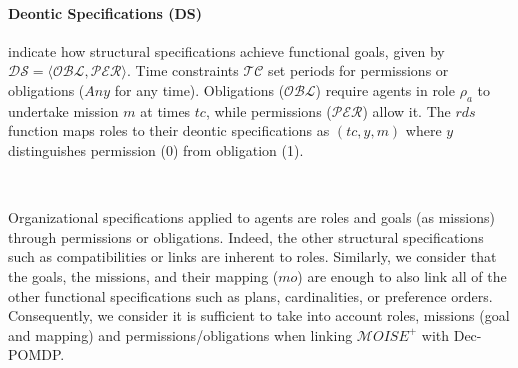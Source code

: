 \documentclass[pdflatex,sn-mathphys-num]{sn-jnl}%
\theoremstyle{thmstyleone}%
\theoremstyle{thmstyletwo}%
\theoremstyle{thmstylethree}%
\begin{document}
\noindent \paragraph{\textbf{Deontic Specifications (DS)}} indicate how structural specifications achieve functional goals, given by $\mathcal{DS} = \langle \mathcal{OBL}, \mathcal{PER} \rangle$. Time constraints $\mathcal{TC}$ set periods for permissions or obligations ($Any$ for any time). Obligations ($\mathcal{OBL}$) require agents in role $\rho_a$ to undertake mission $m$ at times $tc$, while permissions ($\mathcal{PER}$) allow it. The $rds$ function maps roles to their deontic specifications as $(tc, y, m)$ where $y$ distinguishes permission (0) from obligation (1).

\

\noindent Organizational specifications applied to agents are roles and goals (as missions) through permissions or obligations. Indeed, the other structural specifications such as compatibilities or links are inherent to roles. Similarly, we consider that the goals, the missions, and their mapping ($mo$) are enough to also link all of the other functional specifications such as plans, cardinalities, or preference orders.
Consequently, we consider it is sufficient to take into account roles, missions (goal and mapping) and permissions/obligations when linking $\mathcal{M}OISE^+$ with Dec-POMDP. 
\end{document}
